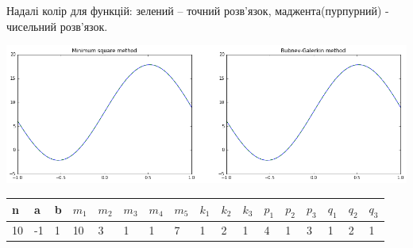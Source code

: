 Надалі колір для функцій: зелений -- точний розв'язок, маджента(пурпурний) - чисельний розв'язок.

\bigskip

\includegraphics[width=1\linewidth]{res.png}

\begin{center}
    \begin{tabular}{| l | l | l | l | l | l | l | l | l | l | l | l | l | l | l | l | l |}
	\hline
	n & a & b & $m_1$ & $m_2$ & $m_3$ & $m_4$ & $m_5$ & $k_1$ & $k_2$ & $k_3$ & $p_1$ & $p_2$ & $p_3$ & $q_1$ & $q_2$ & $q_3$ \\ \hline
	10 & -1 & 1 & 10 & 3 & 1 & 1 & 7 & 1 & 2 & 1 & 4 & 1 & 3 & 1 & 2 & 1 \\ \hline


    \end{tabular}
\end{center}

